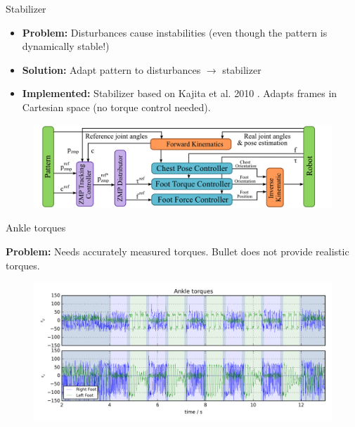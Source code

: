 \begin{frame}{Stabilizer}

\begin{itemize}
\itemsep1pt\parskip0pt
\item
  \textbf{Problem:} Disturbances cause instabilities (even though the
  pattern is dynamically stable!)
\item
  \textbf{Solution:} Adapt pattern to disturbances \(\rightarrow\)
  stabilizer
\item
  \textbf{Implemented:} Stabilizer based on Kajita et al. 2010
  \cite{kajita2010biped}. Adapts frames in Cartesian space (no torque
  control needed).
\end{itemize}

\begin{figure}
  \begin{center}
     \includegraphics[width=\textwidth]{images/stabilizer_architechture.png}
  \end{center}
\end{figure}

\end{frame}

\begin{frame}{Ankle torques}

\textbf{Problem:} Needs accurately measured torques. Bullet does not
provide realistic torques.

\begin{figure}
  \begin{center}
     \includegraphics[width=\textwidth]{images/ankle_torques.png}
  \end{center}
\end{figure}

\end{frame}

